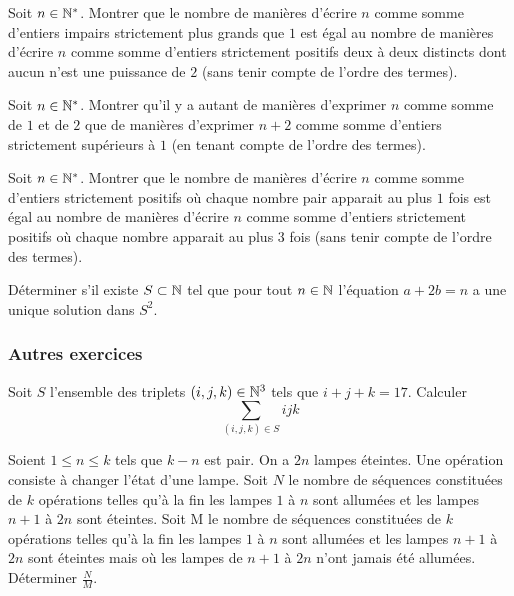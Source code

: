 \begin{exo}
Soit $n\in\mathbb N^*$. Montrer que le nombre de manières d'écrire $n$ comme somme d'entiers impairs strictement plus grands que $1$ est égal au nombre de manières d'écrire $n$ comme somme d'entiers strictement positifs deux à deux distincts dont aucun n'est une puissance de $2$ (sans tenir compte de l'ordre des termes).
\end{exo}


\begin{exo}
Soit $n\in\mathbb N^*$. Montrer qu'il y a autant de manières d'exprimer $n$ comme somme de $1$ et de $2$ que de manières d'exprimer $n+2$ comme somme d'entiers strictement supérieurs à $1$ (en tenant compte de l'ordre des termes).
\end{exo}


\begin{exo}
Soit $n\in\mathbb N^*$. Montrer que le nombre de manières d'écrire $n$ comme somme d'entiers strictement positifs où chaque nombre pair apparait au plus $1$ fois est égal au nombre de manières d'écrire $n$ comme somme d'entiers strictement positifs où chaque nombre apparait au plus $3$ fois (sans tenir compte de l'ordre des termes).
\end{exo}


\begin{exo}
Déterminer s'il existe $S\subset\mathbb N$ tel que pour tout $n\in\mathbb N$ l'équation $a+2b=n$ a une unique solution dans $S^2$.
\end{exo}


\subsubsection{Autres exercices}


\begin{exo}
Soit $S$ l'ensemble des triplets $(i,j,k)\in\mathbb N^3$ tels que $i+j+k=17$. Calculer $$\sum_{(i,j,k)\in S}ijk$$
\end{exo}


\begin{exo}
Soient $1 \leq n \leq k$ tels que $k-n$ est pair. On a $2n$ lampes éteintes. Une opération consiste à changer l'état d'une lampe. Soit $N$ le nombre de séquences constituées de $k$ opérations telles qu'à la fin les lampes $1$ à $n$ sont allumées et les lampes $n+1$ à $2n$ sont éteintes. Soit M le nombre de séquences constituées de $k$ opérations telles qu'à la fin les lampes $1$ à $n$ sont allumées et les lampes $n+1$ à $2n$ sont éteintes mais où les lampes de $n+1$ à $2n$ n'ont jamais été allumées. Déterminer $\frac{N}{M}$.
\end{exo}


